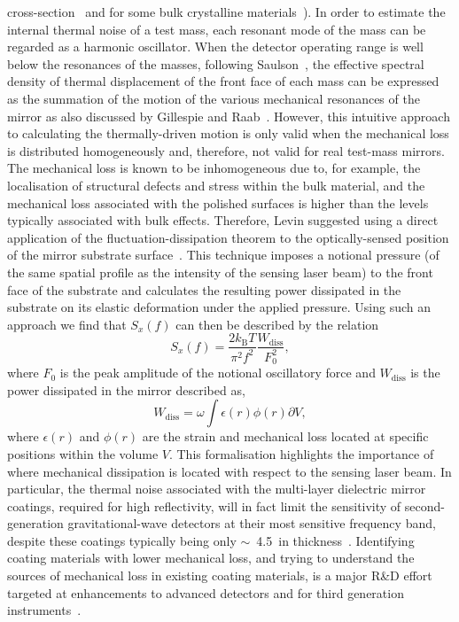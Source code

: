 cross-section~\cite{Nowick} and for some bulk crystalline
materials~\cite{Bragthermo}). In order to estimate the internal thermal noise of
a test mass, each resonant mode of the mass can be regarded as a harmonic
oscillator. When the detector operating range is well below the resonances of
the masses, following Saulson~\cite{Saulson2}, the effective spectral density of
thermal displacement of the front face of each mass can be expressed as the
summation of the motion of the various mechanical resonances of the mirror as
also discussed by Gillespie and Raab~\cite{Gillespie}. However, this intuitive
approach to calculating the thermally-driven motion is only valid when the
mechanical loss is distributed homogeneously and, therefore, not valid for real
test-mass mirrors. The mechanical loss is known to be inhomogeneous due to, for
example, the localisation of structural defects and stress within the bulk
material, and the mechanical loss associated with the polished surfaces is
higher than the levels typically associated with bulk effects.  Therefore, Levin
suggested using a direct application of the fluctuation-dissipation theorem to
the optically-sensed position of the mirror substrate surface~\cite{Levin}.
This technique imposes a notional pressure (of the same spatial profile as the
intensity of the sensing laser beam) to the front face of the substrate and
calculates the resulting power dissipated in the substrate on its elastic
deformation under the applied pressure.  Using such an approach we find that
$S_x(f)$ can then be described by the relation
\begin{equation}
 S_x(f) = \frac{2k_\mathrm{B}T}{\pi^2 f^2} \frac{W_{\mathrm{diss}}}{F_0^2},
 \label{eqn:S-x_Levin}
\end{equation}
where $F_0$ is the peak amplitude of the notional oscillatory force and
$W_{\mathrm{diss}}$ is the power dissipated in the mirror described
as,
\begin{equation}
 W_{\mathrm{diss}} = \omega \int{\epsilon(r)\phi(r)\partial V},
 \label{eqn:S-x_Levin2}
\end{equation}
where $\epsilon(r)$ and $\phi(r)$ are the strain and mechanical loss located at
specific positions within the volume $V$. This formalisation highlights the
importance of where mechanical dissipation is located with respect to the
sensing laser beam.  In particular, the thermal noise associated with the
multi-layer dielectric mirror coatings, required for high reflectivity, will in
fact limit the sensitivity of second-generation gravitational-wave detectors at
their most sensitive frequency band, despite these coatings typically being only
$\sim$~4.5~\mum in thickness~\cite{Harry:2002}. Identifying coating
materials with lower mechanical loss, and trying to understand the sources of
mechanical loss in existing coating materials, is a major R\&D effort targeted
at enhancements to advanced detectors and for third generation
instruments~\cite{Martin:2008}.


